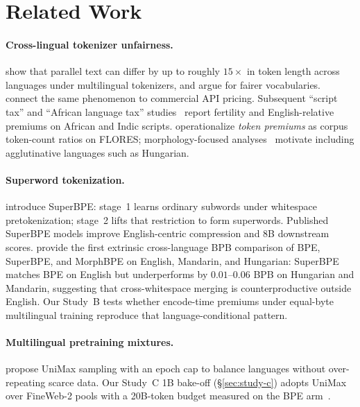 \documentclass[11pt,a4paper]{article}
\begin{document}
\section{Related Work}
\label{sec:related}

\paragraph{Cross-lingual tokenizer unfairness.}
\citet{petrov2023unfairness} show that parallel text can differ by up to roughly $15\times$ in token length across languages under multilingual tokenizers, and argue for fairer vocabularies.
\citet{ahia2023cost} connect the same phenomenon to commercial API pricing.
Subsequent ``script tax'' and ``African language tax'' studies~\citep{dixit2026scripttax,somide2026african} report fertility and English-relative premiums on African and Indic scripts.
\citet{arnett2025inequities} operationalize \emph{token premiums} as corpus token-count ratios on FLORES; morphology-focused analyses~\citep{arnett2024morphology} motivate including agglutinative languages such as Hungarian.

\paragraph{Superword tokenization.}
\citet{liu2025superbpe} introduce SuperBPE: stage~1 learns ordinary subwords under whitespace pretokenization; stage~2 lifts that restriction to form superwords.
Published SuperBPE models improve English-centric compression and 8B downstream scores.
\citet{chowdhury-woolf-2026-benchmarking} provide the first extrinsic cross-language BPB comparison of BPE, SuperBPE, and MorphBPE on English, Mandarin, and Hungarian: SuperBPE matches BPE on English but underperforms by $0.01$--$0.06$ BPB on Hungarian and Mandarin, suggesting that cross-whitespace merging is counterproductive outside English.
Our Study~B tests whether encode-time premiums under equal-byte multilingual training reproduce that language-conditional pattern.

\paragraph{Multilingual pretraining mixtures.}
\citet{chung2023unimax} propose UniMax sampling with an epoch cap to balance languages without over-repeating scarce data.
Our Study~C 1B bake-off (\S\ref{sec:study-c}) adopts UniMax over FineWeb-2 pools with a 20B-token budget measured on the BPE arm~\citep{hoffmann2022chinchilla,muennighoff2023scaling,olmo2025}.
\end{document}
